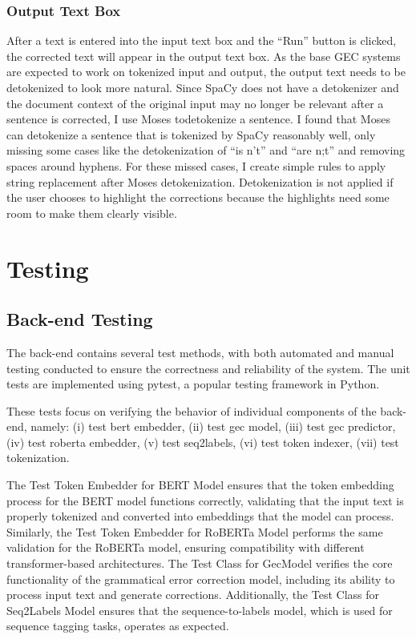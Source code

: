 \subsubsection{Output Text Box}

After a text is entered into the input text box and the ``Run'' button is clicked, the corrected text will appear in the output text box.
As the base GEC systems are expected to work on tokenized input and output, the output text needs to be detokenized to look more natural.
Since SpaCy does not have a detokenizer and the document context of the original input may no longer be relevant after a sentence is corrected, I use Moses todetokenize a sentence.
I found that Moses can detokenize a sentence that is tokenized by SpaCy reasonably well, only missing some cases like the detokenization of ``is n't'' and ``are n;t'' and removing spaces around hyphens.
For these missed cases, I create simple rules to apply string replacement after Moses detokenization.
Detokenization is not applied if the user chooses to highlight the corrections because the highlights need some room to make them clearly visible.

\section{Testing}

\subsection{Back-end Testing}

The back-end contains several test methods, with both automated and manual testing conducted to ensure the correctness and reliability of the system.
The unit tests are implemented using pytest, a popular testing framework in Python.

These tests focus on verifying the behavior of individual components of the back-end, namely:
(i) test bert embedder,
(ii) test gec model,
(iii) test gec predictor,
(iv) test roberta embedder,
(v) test seq2labels,
(vi) test token indexer,
(vii) test tokenization.

The Test Token Embedder for BERT Model ensures that the token embedding process for the BERT model functions correctly, validating that the input text is properly tokenized and converted into embeddings that the model can process.
Similarly, the Test Token Embedder for RoBERTa Model performs the same validation for the RoBERTa model, ensuring compatibility with different transformer-based architectures.
The Test Class for GecModel verifies the core functionality of the grammatical error correction model, including its ability to process input text and generate corrections.
Additionally, the Test Class for Seq2Labels Model ensures that the sequence-to-labels model, which is used for sequence tagging tasks, operates as expected.

